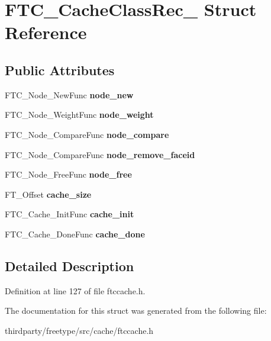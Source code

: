\hypertarget{struct_f_t_c___cache_class_rec__}{}\section{F\+T\+C\+\_\+\+Cache\+Class\+Rec\+\_\+ Struct Reference}
\label{struct_f_t_c___cache_class_rec__}
\subsection*{Public Attributes}
\begin{DoxyCompactItemize}
\item 
\mbox{\label{struct_f_t_c___cache_class_rec___a7106a5782a661a9f5fde7cda87938c50}} 
F\+T\+C\+\_\+\+Node\+\_\+\+New\+Func {\bfseries node\+\_\+new}
\item 
\mbox{\label{struct_f_t_c___cache_class_rec___a482639d31459152ed234a39f8434f3cb}} 
F\+T\+C\+\_\+\+Node\+\_\+\+Weight\+Func {\bfseries node\+\_\+weight}
\item 
\mbox{\label{struct_f_t_c___cache_class_rec___af266a758d3500dbd373769fa8966c5de}} 
F\+T\+C\+\_\+\+Node\+\_\+\+Compare\+Func {\bfseries node\+\_\+compare}
\item 
\mbox{\label{struct_f_t_c___cache_class_rec___a36f5db312b9d685d740b7e74bf1404f6}} 
F\+T\+C\+\_\+\+Node\+\_\+\+Compare\+Func {\bfseries node\+\_\+remove\+\_\+faceid}
\item 
\mbox{\label{struct_f_t_c___cache_class_rec___a5149e5b11978da3077abce8304591a13}} 
F\+T\+C\+\_\+\+Node\+\_\+\+Free\+Func {\bfseries node\+\_\+free}
\item 
\mbox{\label{struct_f_t_c___cache_class_rec___a55796d1d7af59e136234142a4ed0bba6}} 
F\+T\+\_\+\+Offset {\bfseries cache\+\_\+size}
\item 
\mbox{\label{struct_f_t_c___cache_class_rec___a6d45eb4a85dc053c7a2d46c7e4237413}} 
F\+T\+C\+\_\+\+Cache\+\_\+\+Init\+Func {\bfseries cache\+\_\+init}
\item 
\mbox{\label{struct_f_t_c___cache_class_rec___a226669c4d3ce56b8640ec2fccfab5fb6}} 
F\+T\+C\+\_\+\+Cache\+\_\+\+Done\+Func {\bfseries cache\+\_\+done}
\end{DoxyCompactItemize}


\subsection{Detailed Description}


Definition at line 127 of file ftccache.\+h.



The documentation for this struct was generated from the following file\+:\begin{DoxyCompactItemize}
\item 
thirdparty/freetype/src/cache/ftccache.\+h\end{DoxyCompactItemize}
